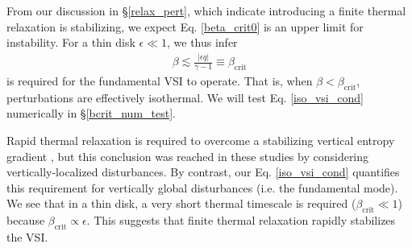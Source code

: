From our discussion in \S\ref{relax_pert}, which indicate introducing
a finite thermal relaxation is stabilizing, we expect 
Eq. \ref{beta_crit0} is an upper limit for instability. For a thin
disk $\epsilon\ll 1$, we thus infer 
\begin{align}\label{iso_vsi_cond}
  \beta \lesssim \frac{|\epsilon q|}{\gamma-1} \equiv
  \beta_\mathrm{crit} 
\end{align}
is required for the fundamental VSI to operate. That is, when
$\beta<\beta_\mathrm{crit}$, perturbations are  effectively isothermal. 
We will test Eq. \ref{iso_vsi_cond} numerically in
\S\ref{bcrit_num_test}.  

Rapid thermal relaxation is required to overcome a stabilizing
vertical entropy gradient \citep{goldreich67,urpin98,urpin03}, but
this conclusion was reached in these studies by considering
vertically-localized disturbances. %
By contrast, our Eq. \ref{iso_vsi_cond} quantifies this requirement
for vertically global disturbances (i.e. the fundamental mode). We see
that in a thin disk, a very short thermal timescale
 is required ($\beta_\mathrm{crit}\ll 1$) because
$\beta_\mathrm{crit}\propto \epsilon$. 
This suggests that
finite thermal relaxation rapidly stabilizes the VSI.  








